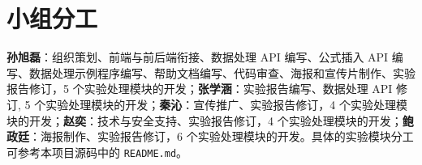 \section{小组分工}

\textbf{孙旭磊}：组织策划、前端与前后端衔接、数据处理 API 编写、公式插入 API 编写、数据处理示例程序编写、帮助文档编写、代码审查、海报和宣传片制作、实验报告修订，5 个实验处理模块的开发；\textbf{张学涵}：实验报告编写、数据处理 API 修订, 5 个实验处理模块的开发；\textbf{秦沁}：宣传推广、实验报告修订，4 个实验处理模块的开发；\textbf{赵奕}：技术与安全支持、实验报告修订，4 个实验处理模块的开发；\textbf{鲍政廷}：海报制作、实验报告修订，6 个实验处理模块的开发。具体的实验模块分工可参考本项目源码中的 \verb|README.md|。